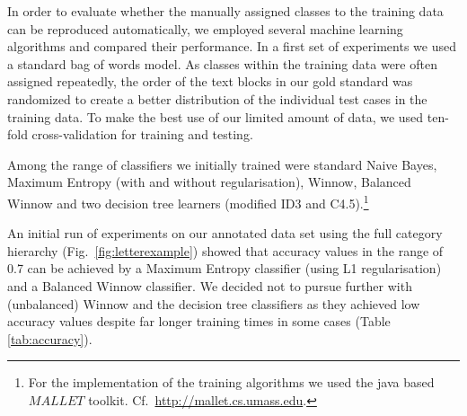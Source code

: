 


In order to evaluate whether the manually assigned classes to the training data can be reproduced automatically, we employed several machine learning algorithms and compared their performance. In a first set of experiments we used a standard bag of words model. As classes within the training data were often assigned repeatedly, the order of the text blocks in our gold standard was randomized to create a better distribution of the individual test cases in the training data. To make the best use of our limited amount of data, we used ten-fold cross-validation for training and testing.

Among the range of classifiers we initially trained were standard Naive Bayes, Maximum Entropy (with and without regularisation), Winnow, Balanced Winnow and two decision tree learners (modified ID3 and C4.5).\footnote{For the implementation of the training algorithms we used the java based $MALLET$ toolkit. Cf.\ \url{http://mallet.cs.umass.edu}.}

An initial run of experiments on our annotated data set using the full category hierarchy (Fig.\ \ref{fig:letterexample}) showed that accuracy values in the range of 0.7 can be achieved by a Maximum Entropy classifier (using L1 regularisation) and a Balanced Winnow classifier. We decided not to pursue further with (unbalanced) Winnow and the decision tree classifiers as they achieved low accuracy values despite far longer training times in some cases (Table \ref{tab:accuracy}).


